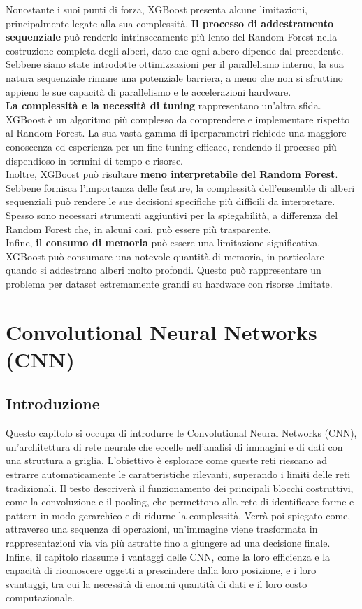 \documentclass[a4paper,12pt]{report}
\begin{document}
	Nonostante i suoi punti di forza, XGBoost presenta alcune limitazioni, principalmente legate alla sua complessità. \textbf{Il processo di addestramento sequenziale} può renderlo intrinsecamente più lento del Random Forest nella costruzione completa degli alberi, dato che ogni albero dipende dal precedente. Sebbene siano state introdotte ottimizzazioni per il parallelismo interno, la sua natura sequenziale rimane una potenziale barriera, a meno che non si sfruttino appieno le sue capacità di parallelismo e le accelerazioni hardware. \\
	\textbf{La complessità e la necessità di tuning} rappresentano un'altra sfida. XGBoost è un algoritmo più complesso da comprendere e implementare rispetto al Random Forest. La sua vasta gamma di iperparametri richiede una maggiore conoscenza ed esperienza per un fine-tuning efficace, rendendo il processo più dispendioso in termini di tempo e risorse. \\
	Inoltre, XGBoost può risultare \textbf{meno interpretabile del Random Forest}. Sebbene fornisca l'importanza delle feature, la complessità dell'ensemble di alberi sequenziali può rendere le sue decisioni specifiche più difficili da interpretare. Spesso sono necessari strumenti aggiuntivi per la spiegabilità, a differenza del Random Forest che, in alcuni casi, può essere più trasparente. \\
	Infine, \textbf{il consumo di memoria} può essere una limitazione significativa. XGBoost può consumare una notevole quantità di memoria, in particolare quando si addestrano alberi molto profondi. Questo può rappresentare un problema per dataset estremamente grandi su hardware con risorse limitate.
	
	\chapter{Convolutional Neural Networks (CNN)}
	
	\section{Introduzione}
	Questo capitolo si occupa di introdurre le Convolutional Neural Networks (CNN), un'architettura di rete neurale che eccelle nell'analisi di immagini e di dati con una struttura a griglia. L'obiettivo è esplorare come queste reti riescano ad estrarre automaticamente le caratteristiche rilevanti, superando i limiti delle reti tradizionali. Il testo descriverà il funzionamento dei principali blocchi costruttivi, come la convoluzione e il pooling, che permettono alla rete di identificare forme e pattern in modo gerarchico e di ridurne la complessità. Verrà poi spiegato come, attraverso una sequenza di operazioni, un'immagine viene trasformata in rappresentazioni via via più astratte fino a giungere ad una decisione finale. Infine, il capitolo riassume i vantaggi delle CNN, come la loro efficienza e la capacità di riconoscere oggetti a prescindere dalla loro posizione, e i loro svantaggi, tra cui la necessità di enormi quantità di dati e il loro costo computazionale. \cite{oshea2015cnn, krizhevsky2012imagenet, simonyan2014very, ioffe2015batch, ba2016layer, wu2018group, poojary2020dataaug}
	
\end{document}
